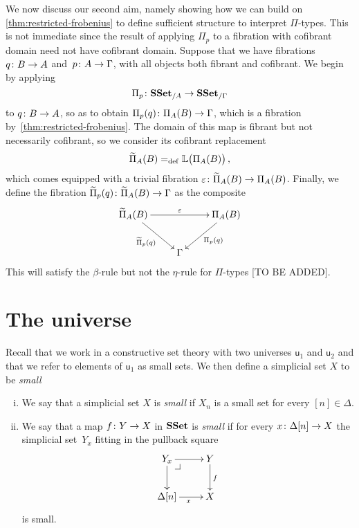 \documentclass[reqno,10pt,a4paper,oneside,draft]{amsart}
\begin{document}
We now discuss our second aim, namely showing how we can build on \cref{thm:restricted-frobenius} 
to define sufficient structure to interpret $\Pi$-types. This is not immediate since the result of applying $\Pi_p$ to a 
fibration with cofibrant domain need not have cofibrant domain.
 Suppose that we have fibrations 
$q \colon B \to A$ and~$p \colon A \to \Gamma$, with
all objects both fibrant and cofibrant. 
We begin by applying 
\[
\Pi_p  \colon \mathbf{SSet}_{/A} \to \mathbf{SSet}_{/\Gamma}
\]
to $q \colon B \to A$, so as to obtain $\Pi_p(q) \colon \Pi_A(B) \to \Gamma$, which is
a fibration by~\cref{thm:restricted-frobenius}. The domain of this map is fibrant but
not necessarily cofibrant, so we consider its cofibrant replacement 
\[
\widetilde{\Pi}_A(B) =_{\operatorname{def}} \mathbb{L} \big( \Pi_A(B)  \big) \, ,
\]
which comes equipped with a trivial fibration $\varepsilon \colon \widetilde{\Pi}_A(B) \to \Pi_A(B)$.
Finally, we define the fibration $\widetilde{\Pi}_p(q) \colon \widetilde{\Pi}_A(B) \to \Gamma$ as 
 the composite
 \[
\xymatrix{
\widetilde{\Pi}_A(B) \ar[rr]^{\varepsilon} \ar[dr]_{\widetilde{\Pi}_p(q) } & & \Pi_A(B) \ar[dl]^{\Pi_p(q)}  \\
 & \Gamma &} 
 \]
This will satisfy the $\beta$-rule but not the $\eta$-rule for $\Pi$-types [TO BE ADDED].


\newpage

\section{The universe}

Recall that we work in a constructive set theory with two universes $\mathsf{u}_1$ and $\mathsf{u}_2$
and that we refer to elements of $\mathsf{u}_1$ as small sets. We then define a simplicial
set $X$ to be \emph{small}


\begin{definition} \hfill 
\label{thm:small}
\begin{enumerate}[(i)]
\item We say that a simplicial set $X$ is \emph{small}  if $X_n$ is a small set for every $[n] \in \Delta$. 
\item We say that a map $f \colon Y \to X$ in $\mathbf{SSet}$ is \emph{small} if for every $x \colon \Delta[n] 
\to X$ the simplicial set~$Y_x$ fitting in the pullback square
\[
\xymatrix{
Y_x \ar[r] \ar[d] \drpullback & Y \ar[d]^{f} \\
\Delta[n] \ar[r]_x & X }
\]
is small.
\end{enumerate}
\end{definition} 
\end{document}
